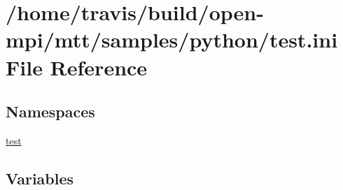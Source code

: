 \hypertarget{test_8ini}{\section{/home/travis/build/open-\/mpi/mtt/samples/python/test.ini File Reference}
\label{test_8ini}
}
\subsection*{Namespaces}
\begin{DoxyCompactItemize}
\item 
\hyperlink{namespacetest}{test}
\end{DoxyCompactItemize}
\subsection*{Variables}
